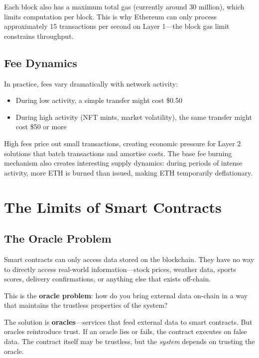 \documentclass[11pt,a4paper]{article}
\newcommand{\keyword}[1]{\textbf{\textcolor{AccentOrange}{#1}}}
\begin{document}
Each block also has a maximum total gas (currently around 30 million), which limits computation per block. This is why Ethereum can only process approximately 15 transactions per second on Layer 1---the block gas limit constrains throughput.

\subsection{Fee Dynamics}

In practice, fees vary dramatically with network activity:
\begin{itemize}
    \item During low activity, a simple transfer might cost \$0.50
    \item During high activity (NFT mints, market volatility), the same transfer might cost \$50 or more
\end{itemize}

High fees price out small transactions, creating economic pressure for Layer 2 solutions that batch transactions and amortise costs. The base fee burning mechanism also creates interesting supply dynamics: during periods of intense activity, more ETH is burned than issued, making ETH temporarily deflationary.

\section{The Limits of Smart Contracts}

\subsection{The Oracle Problem}

Smart contracts can only access data stored on the blockchain. They have no way to directly access real-world information---stock prices, weather data, sports scores, delivery confirmations, or anything else that exists off-chain.

This is the \keyword{oracle problem}: how do you bring external data on-chain in a way that maintains the trustless properties of the system?

The solution is \keyword{oracles}---services that feed external data to smart contracts. But oracles reintroduce trust. If an oracle lies or fails, the contract executes on false data. The contract itself may be trustless, but the \textit{system} depends on trusting the oracle.
\end{document}
